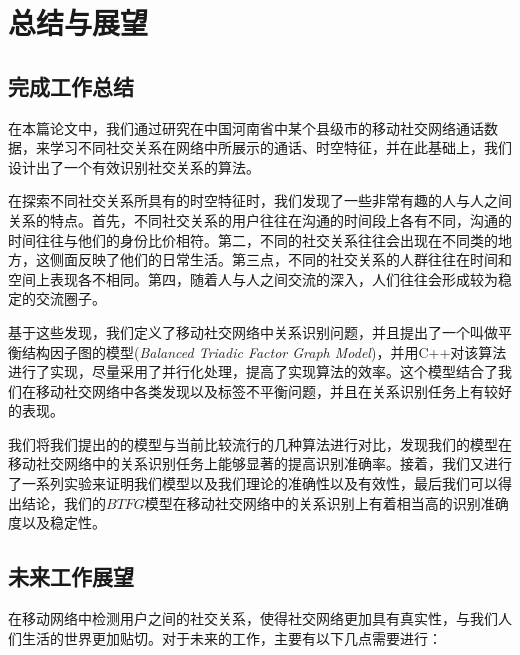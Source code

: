 \chapter{总结与展望}

\section{完成工作总结}
在本篇论文中，我们通过研究在中国河南省中某个县级市的移动社交网络通话数据，来学习不同社交关系在网络中所展示的通话、时空特征，并在此基础上，我们设计出了一个有效识别社交关系的算法。

在探索不同社交关系所具有的时空特征时，我们发现了一些非常有趣的人与人之间关系的特点。首先，不同社交关系的用户往往在沟通的时间段上各有不同，沟通的时间往往与他们的身份比价相符。第二，不同的社交关系往往会出现在不同类的地方，这侧面反映了他们的日常生活。第三点，不同的社交关系的人群往往在时间和空间上表现各不相同。第四，随着人与人之间交流的深入，人们往往会形成较为稳定的交流圈子。

基于这些发现，我们定义了移动社交网络中关系识别问题，并且提出了一个叫做平衡结构因子图的模型(\textit{Balanced Triadic Factor Graph Model})，并用C++对该算法进行了实现，尽量采用了并行化处理，提高了实现算法的效率。这个模型结合了我们在移动社交网络中各类发现以及标签不平衡问题，并且在关系识别任务上有较好的表现。


我们将我们提出的的模型与当前比较流行的几种算法进行对比，发现我们的模型在移动社交网络中的关系识别任务上能够显著的提高识别准确率。接着，我们又进行了一系列实验来证明我们模型以及我们理论的准确性以及有效性，最后我们可以得出结论，我们的$BTFG$模型在移动社交网络中的关系识别上有着相当高的识别准确度以及稳定性。


\section{未来工作展望}
在移动网络中检测用户之间的社交关系，使得社交网络更加具有真实性，与我们人们生活的世界更加贴切。对于未来的工作，主要有以下几点需要进行：

